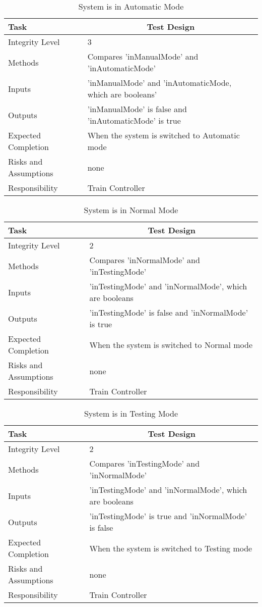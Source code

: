 \documentclass[]{article}
\begin{document}
\begin{table}[H]
	\centering
	\caption{System is in Automatic Mode}
	\begin{tabular}{|l|l|}
		\hline
		Task & \multicolumn{1}{c|}{Test Design} \\ \hline
		Integrity Level & 3 \\ \hline
		Methods & Compares 'inManualMode' and 'inAutomaticMode'\\ \hline
		Inputs & 'inManualMode' and 'inAutomaticMode, which are booleans'\\ \hline
		Outputs & 'inManualMode' is false and 'inAutomaticMode' is true \\ \hline
		Expected Completion & When the system is switched to Automatic mode\\ \hline
		Risks and Assumptions & none\\ \hline
		Responsibility & Train Controller\\ \hline
	\end{tabular}
\end{table}

\begin{table}[H]
	\centering
	\caption{System is in Normal Mode}
	\begin{tabular}{|l|l|}
		\hline
		Task & \multicolumn{1}{c|}{Test Design} \\ \hline
		Integrity Level & 2\\ \hline
		Methods & Compares 'inNormalMode' and 'inTestingMode'\\ \hline
		Inputs & 'inTestingMode' and 'inNormalMode', which are booleans\\ \hline
		Outputs & 'inTestingMode' is false and 'inNormalMode' is true \\ \hline
		Expected Completion & When the system is switched to Normal mode\\ \hline
		Risks and Assumptions & none\\ \hline
		Responsibility & Train Controller\\ \hline
	\end{tabular}
\end{table}

\begin{table}[H]
	\centering
	\caption{System is in Testing Mode}
	\begin{tabular}{|l|l|}
		\hline
		Task & \multicolumn{1}{c|}{Test Design} \\ \hline
		Integrity Level & 2 \\ \hline
		Methods & Compares 'inTestingMode' and 'inNormalMode'\\ \hline
		Inputs & 'inTestingMode' and 'inNormalMode', which are booleans\\ \hline
		Outputs & 'inTestingMode' is true and 'inNormalMode'  is false\\ \hline
		Expected Completion & When the system is switched to Testing mode\\ \hline
		Risks and Assumptions & none\\ \hline
		Responsibility & Train Controller\\ \hline
	\end{tabular}
\end{table}
\end{document}
